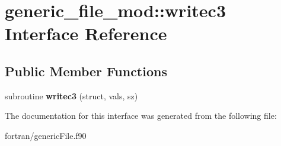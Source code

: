 \hypertarget{interfacegeneric__file__mod_1_1writec3}{}\section{generic\+\_\+file\+\_\+mod\+:\+:writec3 Interface Reference}
\label{interfacegeneric__file__mod_1_1writec3}
\subsection*{Public Member Functions}
\begin{DoxyCompactItemize}
\item 
\mbox{\label{interfacegeneric__file__mod_1_1writec3_a63e1dd19349d61167597f439aa5ae990}} 
subroutine {\bfseries writec3} (struct, vals, sz)
\end{DoxyCompactItemize}


The documentation for this interface was generated from the following file\+:\begin{DoxyCompactItemize}
\item 
fortran/generic\+File.\+f90\end{DoxyCompactItemize}
